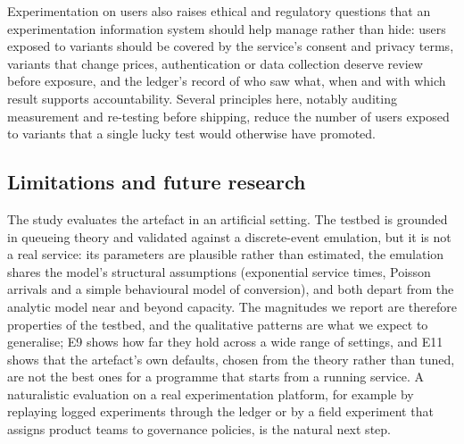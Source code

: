 \documentclass[preprint,12pt,authoryear]{elsarticle}
\theoremstyle{definition}
\begin{document}
Experimentation on users also raises ethical and regulatory questions that an experimentation information system should help manage rather than hide: users exposed to variants should be covered by the service's consent and privacy terms, variants that change prices, authentication or data collection deserve review before exposure, and the ledger's record of who saw what, when and with which result supports accountability. Several principles here, notably auditing measurement and re-testing before shipping, reduce the number of users exposed to variants that a single lucky test would otherwise have promoted.

\subsection{Limitations and future research}

The study evaluates the artefact in an artificial setting. The testbed is grounded in queueing theory and validated against a discrete-event emulation, but it is not a real service: its parameters are plausible rather than estimated, the emulation shares the model's structural assumptions (exponential service times, Poisson arrivals and a simple behavioural model of conversion), and both depart from the analytic model near and beyond capacity. The magnitudes we report are therefore properties of the testbed, and the qualitative patterns are what we expect to generalise; E9 shows how far they hold across a wide range of settings, and E11 shows that the artefact's own defaults, chosen from the theory rather than tuned, are not the best ones for a programme that starts from a running service. A naturalistic evaluation on a real experimentation platform, for example by replaying logged experiments through the ledger or by a field experiment that assigns product teams to governance policies, is the natural next step.
\end{document}
